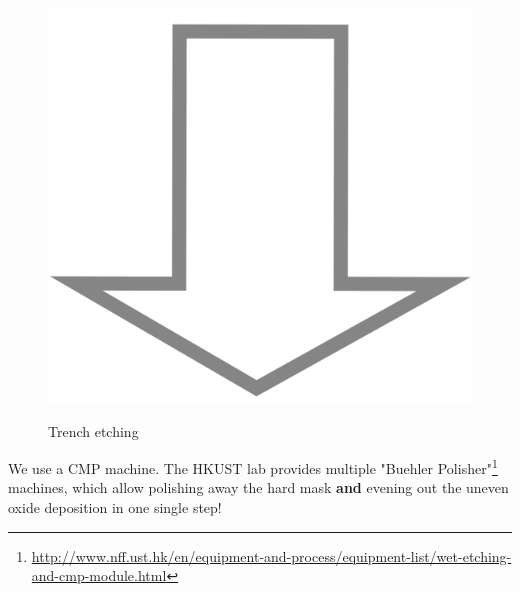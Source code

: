 \begin{figure}[H]
	\centering
	\begin{tikzpicture}[node distance = 3cm, auto, thick,scale=\CrossSectionOnly, every node/.style={transform shape}]
		
	\end{tikzpicture} \\
	\includegraphics[scale=0.01]{down_arrow.png} \\
	\begin{tikzpicture}[node distance = 3cm, auto, thick,scale=\CrossSectionOnly, every node/.style={transform shape}]
		
	\end{tikzpicture}
	\caption{Trench etching}
\end{figure}

We use a CMP machine. The HKUST lab provides multiple "Buehler Polisher"\footnote{\url{http://www.nff.ust.hk/en/equipment-and-process/equipment-list/wet-etching-and-cmp-module.html}} machines, which allow polishing away the hard mask \textbf{and} evening out the uneven oxide deposition in one single step!

